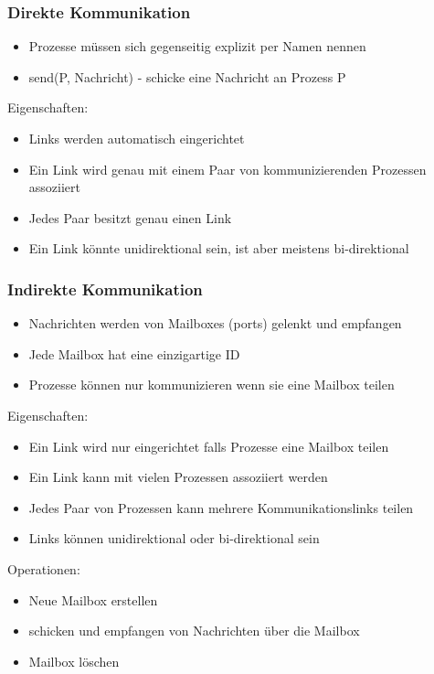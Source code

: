 \documentclass[a4paper]{scrreprt}
\begin{document}
\subsubsection {Direkte Kommunikation}
	\begin{itemize}
		\item Prozesse müssen sich gegenseitig explizit per Namen nennen
		\item send(P, Nachricht) - schicke eine Nachricht an Prozess P
	\end{itemize}
	Eigenschaften:
	\begin{itemize}
		\item Links werden automatisch eingerichtet
		\item Ein Link wird genau mit einem Paar von kommunizierenden Prozessen assoziiert
		\item Jedes Paar besitzt genau einen Link
		\item Ein Link könnte unidirektional sein, ist aber meistens bi-direktional
	\end{itemize}
	
\subsubsection{Indirekte Kommunikation}
	\begin{itemize}
		\item Nachrichten werden von Mailboxes (ports) gelenkt und empfangen
		\item Jede Mailbox hat eine einzigartige ID
		\item Prozesse können nur kommunizieren wenn sie eine Mailbox teilen
	\end{itemize}
	Eigenschaften:
	\begin{itemize}
		\item Ein Link wird nur eingerichtet falls Prozesse eine Mailbox teilen
		\item Ein Link kann mit vielen Prozessen assoziiert werden
		\item Jedes Paar von Prozessen kann mehrere Kommunikationslinks teilen
		\item Links können unidirektional oder bi-direktional sein
	\end{itemize}
	Operationen:
	\begin{itemize}
		\item Neue Mailbox erstellen
		\item schicken und empfangen von Nachrichten über die Mailbox
		\item Mailbox löschen
	\end{itemize}
	
\end{document}
